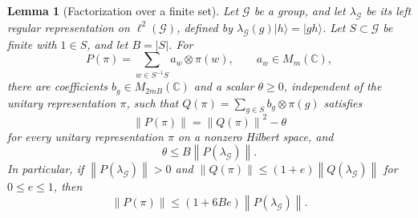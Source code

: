 \documentclass[11pt]{article}
\numberwithin{equation}{section}
\newtheorem{lemma}[theorem]{Lemma}
\theoremstyle{boldremark}\newtheorem{remark}[theorem]{Remark}
\newcommand{\C}{\mathbb C}
\newcommand{\M}{M}
\newcommand{\norm}[1]{\left\lVert #1\right\rVert}
\newcommand{\ket}[1]{\lvert #1\rangle}
\begin{document}
\begin{lemma}[Factorization over a finite set]\label{lem:linear}
Let $\mathcal G$ be a group, and let $\lambda_{\mathcal G}$ be its
left regular representation on $\ell^2(\mathcal G)$, defined by
$\lambda_{\mathcal G}(g)\ket h=\ket{gh}$.
Let $S\subset\mathcal G$ be finite with $1\in S$, and let $B=|S|$. For
\[
 P(\pi)=\sum_{w\in S^{-1}S}a_w\otimes\pi(w),\qquad a_w\in\M_m(\C),
\]
there are coefficients $b_g\in\M_{2mB}(\C)$ and a scalar $\theta\ge0$,
independent of the unitary representation $\pi$, such that
$Q(\pi)=\sum_{g\in S}b_g\otimes\pi(g)$ satisfies
\begin{equation}
 \norm{P(\pi)}=\norm{Q(\pi)}^2-\theta
 \label{eq:linear-id}
\end{equation}
for every unitary representation $\pi$ on a nonzero Hilbert space,
and
\begin{equation}
 \theta\le B\norm{P(\lambda_{\mathcal G})}.
 \label{eq:theta}
\end{equation}
In particular, if $\norm{P(\lambda_{\mathcal G})}>0$ and
$\norm{Q(\pi)}\le(1+e)\norm{Q(\lambda_{\mathcal G})}$ for $0\le e\le1$, then
\[
 \norm{P(\pi)}\le(1+6Be)\norm{P(\lambda_{\mathcal G})}.
\]
\end{lemma}
\end{document}
